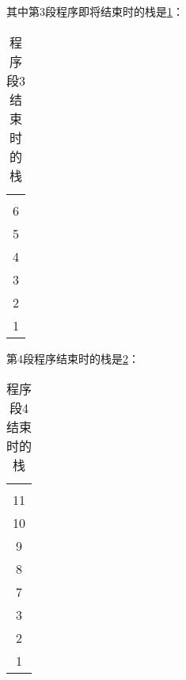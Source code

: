 \documentclass[UTF8]{ctexart}
\begin{document}
其中第3段程序即将结束时的栈是\ref{2}：

\begin{table}[htbp!]
    \centering
    \begin{tabular}{|c|}
        \hline
        \\
        6\\
        5\\
        4\\
        3\\
        2\\
        1\\
        \hline
        
    \end{tabular}
    \caption{程序段3结束时的栈}
    \label{2}
\end{table}

第4段程序结束时的栈是\ref{3}：

\begin{table}[htbp!]
    \centering
    \begin{tabular}{|c|}
        \hline
        \\
        11\\
        10\\
        9\\
        8\\
        7\\
        3\\
        2\\
        1\\
        \hline
        
    \end{tabular}
    \caption{程序段4结束时的栈}
    \label{3}
\end{table}
\end{document}
